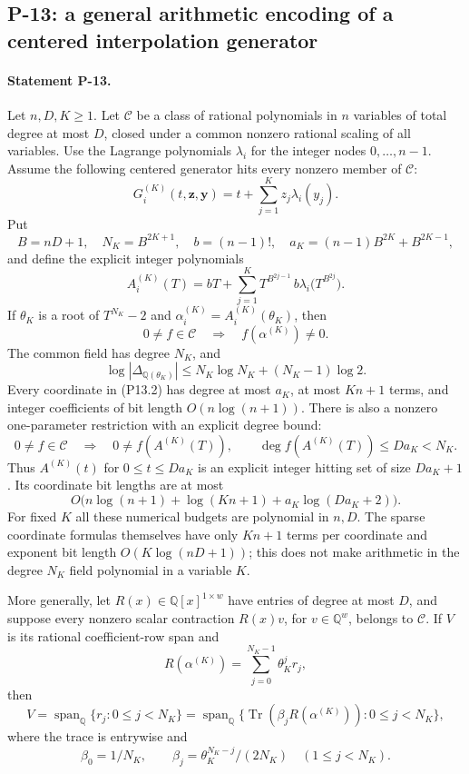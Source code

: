\subsection{P-13: a general arithmetic encoding of a centered interpolation generator}
\paragraph{Statement P-13.}
Let $n,D,K\geq1$. Let $\mathcal C$ be a class of rational
polynomials in $n$ variables of total degree at most $D$, closed
under a common nonzero rational scaling of all variables.
Use the Lagrange polynomials $\lambda_i$ for the integer nodes
$0,\ldots,n-1$. Assume the following centered generator hits
every nonzero member of $\mathcal C$:
\[
 G_i^{(K)}(t,\mathbf z,\mathbf y)
       =t+\sum_{j=1}^Kz_j\lambda_i(y_j).
 \tag{P13.1}
\]
Put
\[
 B=nD+1,\quad N_K=B^{2K+1},\quad b=(n-1)!,\quad
 a_K=(n-1)B^{2K}+B^{2K-1},
\]
and define the explicit integer polynomials
\[
 A_i^{(K)}(T)=bT+\sum_{j=1}^{K}
       T^{B^{2j-1}}\,b\lambda_i\bigl(T^{B^{2j}}\bigr).
 \tag{P13.2}
\]
If $\theta_K$ is a root of $T^{N_K}-2$ and
$\alpha_i^{(K)}=A_i^{(K)}(\theta_K)$, then
\[
 0\ne f\in\mathcal C
       \quad\Longrightarrow\quad f(\alpha^{(K)})\ne0.
 \tag{P13.3}
\]
The common field has degree $N_K$, and
\[
 \log|\Delta_{\mathbb Q(\theta_K)}|
       \leq N_K\log N_K+(N_K-1)\log2.
 \tag{P13.4}
\]
Every coordinate in (P13.2) has degree at most $a_K$, at most
$Kn+1$ terms, and integer coefficients of bit length
$O(n\log(n+1))$. There is also a nonzero one-parameter
restriction with an explicit degree bound:
\[
 0\ne f\in\mathcal C
   \quad\Longrightarrow\quad
 0\ne f(A^{(K)}(T)),\qquad
 \deg f(A^{(K)}(T))\leq Da_K<N_K.
 \tag{P13.5}
\]
Thus $A^{(K)}(t)$ for $0\leq t\leq Da_K$ is an explicit
integer hitting set of size $Da_K+1$. Its coordinate bit lengths
are at most
\[
 O\bigl(n\log(n+1)+\log(Kn+1)+a_K\log(Da_K+2)\bigr).
 \tag{P13.6}
\]
For fixed $K$ all these numerical budgets are polynomial in
$n,D$. The sparse coordinate formulas themselves have only
$Kn+1$ terms per coordinate and exponent bit length
$O(K\log(nD+1))$; this does not make arithmetic in the degree
$N_K$ field polynomial in a variable $K$.

More generally, let $R(x)\in\mathbb Q[x]^{1\times w}$ have
entries of degree at most $D$, and suppose every nonzero scalar
contraction $R(x)v$, for $v\in\mathbb Q^w$, belongs to
$\mathcal C$. If $V$ is its rational coefficient-row span and
\[
 R(\alpha^{(K)})=\sum_{j=0}^{N_K-1}\theta_K^j r_j,
\]
then
\[
 V=\operatorname{span}_{\mathbb Q}\{r_j:0\leq j<N_K\}
  =\operatorname{span}_{\mathbb Q}
    \{\operatorname{Tr}(\beta_jR(\alpha^{(K)})):0\leq j<N_K\},
 \tag{P13.7}
\]
where the trace is entrywise and
\[
 \beta_0=1/N_K,\qquad
 \beta_j=\theta_K^{N_K-j}/(2N_K)\quad(1\leq j<N_K).
\]

